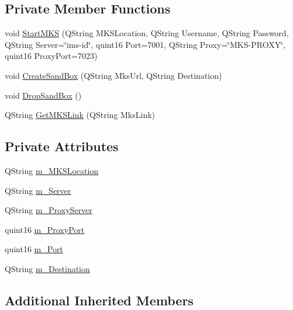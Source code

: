 \subsection*{Private Member Functions}
\begin{DoxyCompactItemize}
\item 
void \hyperlink{class_r_w_1_1_c_o_r_e_1_1_m_k_s_wrapper_ae6f651398e83b56aca4b9f0da3e417de}{Start\+M\+KS} (Q\+String M\+K\+S\+Location, Q\+String Username, Q\+String Password, Q\+String Server=\char`\"{}ims-\/id\char`\"{}, quint16 Port=7001, Q\+String Proxy=\char`\"{}M\+KS-\/P\+R\+O\+XY\char`\"{}, quint16 Proxy\+Port=7023)
\item 
void \hyperlink{class_r_w_1_1_c_o_r_e_1_1_m_k_s_wrapper_a75d87604a9244ce6e3a41934dd60b28f}{Create\+Sand\+Box} (Q\+String Mks\+Url, Q\+String Destination)
\item 
void \hyperlink{class_r_w_1_1_c_o_r_e_1_1_m_k_s_wrapper_a1f4bcd6096a326fc1329f1d63e207ec3}{Drop\+Sand\+Box} ()
\item 
Q\+String \hyperlink{class_r_w_1_1_c_o_r_e_1_1_m_k_s_wrapper_af8af87ae9a71d99e47e90b880091a604}{Get\+M\+K\+S\+Link} (Q\+String Mks\+Link)
\end{DoxyCompactItemize}
\subsection*{Private Attributes}
\begin{DoxyCompactItemize}
\item 
Q\+String \hyperlink{class_r_w_1_1_c_o_r_e_1_1_m_k_s_wrapper_a29a3be9d63ce87c3c4eaa17ac058c358}{m\+\_\+\+M\+K\+S\+Location}
\item 
Q\+String \hyperlink{class_r_w_1_1_c_o_r_e_1_1_m_k_s_wrapper_ae692d4f39fa2ff103a409afd2400bd50}{m\+\_\+\+Server}
\item 
Q\+String \hyperlink{class_r_w_1_1_c_o_r_e_1_1_m_k_s_wrapper_a61772018c0b8e4a38b4576dd93c00949}{m\+\_\+\+Proxy\+Server}
\item 
quint16 \hyperlink{class_r_w_1_1_c_o_r_e_1_1_m_k_s_wrapper_a9f64eb7e96f76b3af19530374954de92}{m\+\_\+\+Proxy\+Port}
\item 
quint16 \hyperlink{class_r_w_1_1_c_o_r_e_1_1_m_k_s_wrapper_a926dfddf01bc5e1815d4172b10733470}{m\+\_\+\+Port}
\item 
Q\+String \hyperlink{class_r_w_1_1_c_o_r_e_1_1_m_k_s_wrapper_a04dc61f3e323398af1c199e2ff044462}{m\+\_\+\+Destination}
\end{DoxyCompactItemize}
\subsection*{Additional Inherited Members}


